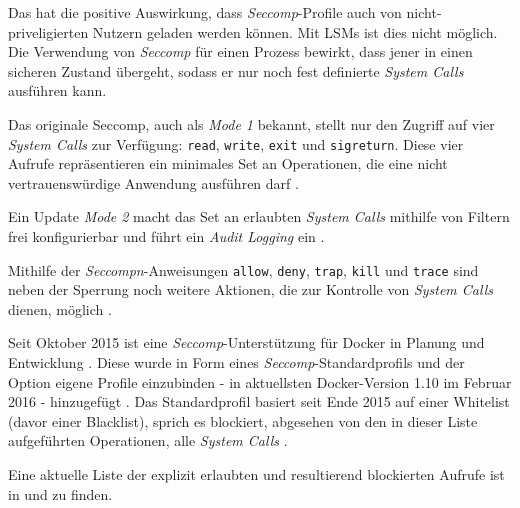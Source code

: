 \documentclass[../main.tex]{subfiles}
\begin{document}
{			Das hat die positive Auswirkung, dass \emph{Seccomp}-Profile auch von nicht-priveligierten Nutzern geladen werden können. Mit LSMs ist dies nicht möglich.
			Die Verwendung von \emph{Seccomp} für einen Prozess bewirkt, dass jener in einen \glqq{}sicheren\grqq{} Zustand übergeht, sodass er nur noch fest definierte \emph{System Calls} ausführen kann.



			Das originale Seccomp, auch als \emph{Mode 1} bekannt, stellt nur den Zugriff auf vier \emph{System Calls} zur Verfügung: \texttt{read}, \texttt{write}, \texttt{exit} und \texttt{sigreturn}. Diese vier Aufrufe repräsentieren ein minimales Set an Operationen, die eine nicht vertrauenswürdige Anwendung ausführen darf \cite{linuxSecOverview}.

			Ein Update \emph{Mode 2} macht das Set an erlaubten \emph{System Calls} mithilfe von Filtern frei konfigurierbar und führt ein \emph{Audit Logging} ein	\cite{linuxSecOverview}\cite{seccompGitDesc}.

			Mithilfe der \emph{Seccompn}-Anweisungen \texttt{allow}, \texttt{deny}, \texttt{trap}, \texttt{kill} und \texttt{trace} sind neben der Sperrung noch weitere Aktionen, die zur Kontrolle von \emph{System Calls} dienen, möglich \cite{docker110Security}.

			Seit Oktober 2015 ist eine \emph{Seccomp}-Unterstützung für Docker in Planung und Entwicklung \cite{githubGeneralSecProfiles}\cite{githubSeccompIntegration}. Diese wurde in Form eines \emph{Seccomp}-Standardprofils und der Option eigene Profile einzubinden - in aktuellsten Docker-Version 1.10 im Februar 2016 - hinzugefügt \cite{githubDockerChangelog}\cite{githubSeccompDoc}\cite{githubSeccompProfile}\cite{docker110Security}. Das Standardprofil basiert seit Ende 2015 auf einer Whitelist (davor einer Blacklist), sprich es blockiert, abgesehen von den in dieser Liste aufgeführten Operationen, alle \emph{System Calls} \cite{githubSeccompDoc}.

			Eine aktuelle Liste der explizit erlaubten und resultierend blockierten Aufrufe ist in \cite{githubSeccompProfile} und \cite{githubSeccompDoc} zu finden.

}
\end{document}
